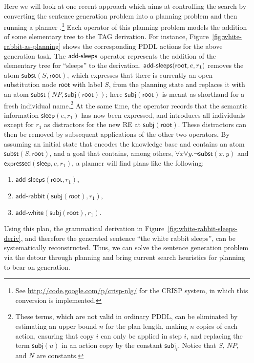 Here we will look at one recent approach which aims at controlling the
search by converting the sentence generation problem into a planning
problem and then running a planner \citet{KolSto07}.\footnote{See
  \url{http://code.google.com/p/crisp-nlg/} for the CRISP system, in
  which this conversion is implemented.} Each operator of this
planning problem models the addition of some elementary tree to the
TAG derivation. For instance,
Figure~\ref{fig:white-rabbit-as-planning} shows the corresponding PDDL
actions for the above generation task. The $\mathsf{add}\textsf{-}\mathsf{sleeps}$ operator
represents the addition of the elementary tree for ``sleeps'' to the
derivation. $\mathsf{add}\textsf{-}\mathsf{sleeps}(\mathsf{root},e,r_1)$ removes the atom
$\mathsf{subst}(S,\mathsf{root})$, which expresses that there is
currently an open substitution node $\mathsf{root}$ with label $S$,
from the planning state and replaces it with an atom
$\mathsf{subst}(NP,\mathsf{subj}(\mathsf{root}))$; here
$\mathsf{subj}(\mathsf{root})$ is meant as shorthand for a fresh
individual name.\footnote{These terms, which are not valid in ordinary
  PDDL, can be eliminated by estimating an upper bound $n$ for the
  plan length, making $n$ copies of each action, ensuring that copy
  $i$ can only be applied in step $i$, and replacing the term
  $\mathsf{subj}(u)$ in an action copy by the constant
  $\mathsf{subj}_i$. Notice that $S$, $NP$, and $N$ are constants.}
At the same time, the operator records that the semantic information
$\mathsf{sleep}(e,r_1)$ has now been expressed, and introduces all
individuals except for $r_1$ as distractors for the new RE at
$\mathsf{subj}(\mathsf{root})$. These distractors can then be removed
by subsequent applications of the other two operators. By assuming an
initial state that encodes the knowledge base and contains an atom
$\mathsf{subst}(S,\mathsf{root})$, and a goal that contains, among
others, $\forall x \forall y. \neg \mathsf{subst}(x,y)$ and
$\mathsf{expressed}(\mathsf{sleep},e,r_1)$, a planner will find plans
like the following:
%
\begin{enumerate}
\item $\mathsf{add}\textsf{-}\mathsf{sleeps}(\mathsf{root}, r_1)$,
\item $\mathsf{add}\textsf{-}\mathsf{rabbit}(\mathsf{subj}(\mathsf{root}),r_1)$,
\item $\mathsf{add}\textsf{-}\mathsf{white}(\mathsf{subj}(\mathsf{root}),r_1)$.
\end{enumerate}
%
Using this plan, the grammatical derivation in
Figure~\ref{fig:white-rabbit-sleeps-deriv}, and therefore the
generated sentence ``the white rabbit sleeps'', can be systematically
reconstructed. Thus, we can solve the sentence generation problem via
the detour through planning and bring current search heuristics for
planning to bear on generation.


